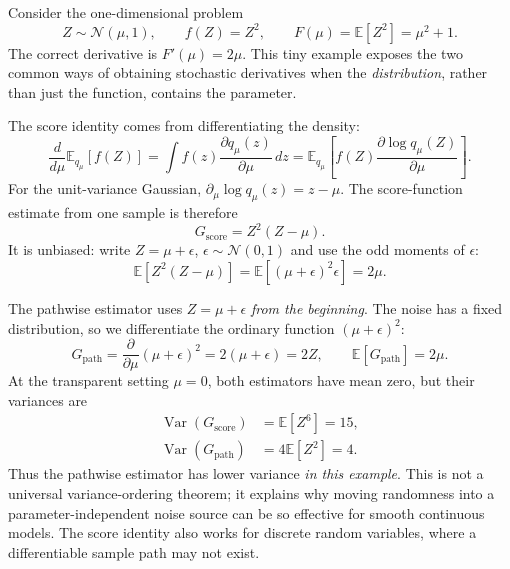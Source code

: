 Consider the one-dimensional problem
\[
 Z\sim\mathcal N(\mu,1),\qquad f(Z)=Z^2,\qquad
 F(\mu)=\mathbb E[Z^2]=\mu^2+1.
\]
The correct derivative is $F'(\mu)=2\mu$. This tiny example exposes the two common ways of obtaining stochastic derivatives when the \emph{distribution}, rather than just the function, contains the parameter.

The score identity comes from differentiating the density:
\[
 \frac{d}{d\mu}\mathbb E_{q_\mu}[f(Z)]
 =\int f(z)\frac{\partial q_\mu(z)}{\partial\mu}\,dz
 =\mathbb E_{q_\mu}\!\left[
 f(Z)\frac{\partial\log q_\mu(Z)}{\partial\mu}\right].
\]
For the unit-variance Gaussian, $\partial_\mu\log q_\mu(z)=z-\mu$. The score-function estimate from one sample is therefore
\[
 G_{\mathrm{score}}=Z^2(Z-\mu).
\]
It is unbiased: write $Z=\mu+\epsilon$, $\epsilon\sim\mathcal N(0,1)$ and use the odd moments of $\epsilon$:
\[
 \mathbb E[Z^2(Z-\mu)]
 =\mathbb E[(\mu+\epsilon)^2\epsilon]
 =2\mu.
\]

The pathwise estimator uses $Z=\mu+\epsilon$ \emph{from the beginning}. The noise has a fixed distribution, so we differentiate the ordinary function $(\mu+\epsilon)^2$:
\[
 G_{\mathrm{path}}
 =\frac{\partial}{\partial\mu}(\mu+\epsilon)^2
 =2(\mu+\epsilon)=2Z,\qquad
 \mathbb E[G_{\mathrm{path}}]=2\mu.
\]
At the transparent setting $\mu=0$, both estimators have mean zero, but their variances are
\[
 \begin{aligned}
 \operatorname{Var}(G_{\mathrm{score}})
 &=\mathbb E[Z^6]=15,\\
 \operatorname{Var}(G_{\mathrm{path}})
 &=4\mathbb E[Z^2]=4.
 \end{aligned}
\]
Thus the pathwise estimator has lower variance \emph{in this example}. This is not a universal variance-ordering theorem; it explains why moving randomness into a parameter-independent noise source can be so effective for smooth continuous models. The score identity also works for discrete random variables, where a differentiable sample path may not exist.

